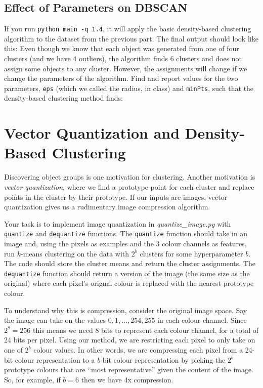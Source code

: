 \documentclass{article}
\begin{document}
\subsection{Effect of Parameters on DBSCAN}

If you run \verb|python main -q 1.4|, it will apply the basic density-based clustering algorithm to the dataset from the previous part. The final output should look like this:
Even though we know that each object was generated from one of four clusters (and we have 4 outliers), the algorithm finds 6 clusters and does not assign some objects to any cluster. However, the assignments will change if we change the parameters of the algorithm. Find and report values for the two parameters, \texttt{eps} (which we called the radius, in class) and \texttt{minPts}, such that the density-based clustering method finds:


\section{Vector Quantization and Density-Based Clustering}

Discovering object groups is one motivation for clustering. Another motivation is \emph{vector quantization}, where we find a prototype point for each cluster and replace points in the cluster by their prototype. If our inputs are images, vector quantization gives us a rudimentary image compression algorithm.

Your task is to implement image quantization in \emph{quantize\_image.py} with \texttt{quantize} and \texttt{dequantize} functions. The \texttt{quantize} function should take in an image and, using the pixels as examples and the 3 colour channels as features, run $k$-means clustering on the data with $2^b$ clusters for some hyperparameter $b$. The code should store the cluster means and return the cluster assignments. The \texttt{dequantize} function should return a version of the image (the same size as the original) where each pixel's orignal colour is replaced with the nearest prototype colour. 

To understand why this is compression, consider the original image space. Say the image can take on the values $0,1,\ldots,254,255$ in each colour channel. Since $2^8=256$ this means we need 8 bits to represent each colour channel, for a total of 24 bits per pixel. Using our method, we are restricting each pixel to only take on one of $2^b$ colour values. In other words, we are compressing each pixel from a 24-bit colour representation to a $b$-bit colour representation by picking the $2^b$ prototype colours that are ``most representative'' given the content of the image. So, for example, if $b=6$ then we have 4x compression.
\end{document}
